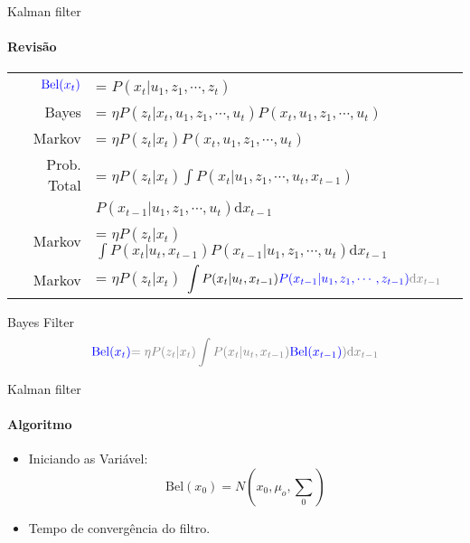 \documentclass{beamer}
\begin{document}
\begin{frame}{Kalman filter}
    \framesubtitle{Revisão}

    \setlength\extrarowheight{5pt}
        \begin{tabular}{r l}
            $\color{blue}{\text{Bel}}(x_t)$ & = $P(x_t| u_1, z_1,  \cdots, z_t)$ \\
            Bayes & = $\eta P(z_t|x_t,  u_1, z_1,  \cdots,  u_t)P(x_t, u_1, z_1, \cdots, u_t)$ \\
            Markov & = $\eta P(z_t|x_t)P(x_t, u_1, z_1, \cdots, u_t)$ \\
            Prob. Total & = $\eta P(z_t|x_t)\displaystyle\int P(x_t| u_1, z_1, \cdots, u_t,x_{t-1})$ \\
                        &  \quad \quad \quad $P(x_{t-1}| u_1, z_1, \cdots, u_t)\text{d}x_{t-1}$\\
            Markov & = $\eta P(z_t|x_t)$ $\displaystyle\int P(x_t| u_t,x_{t-1})P(x_{t-1}| u_1, z_1, \cdots, u_t)\text{d}x_{t-1}$ \\
            Markov & = $\eta P(z_t|x_t)$ $\displaystyle\int P(x_t| u_t,x_{t-1})\color{blue}{P(x_{t-1}| u_1, z_1, \cdots, z_{t-1}})\color{gray}{\text{d}x_{t-1}}$ \\
        \end{tabular}   
    \begin{block}{Bayes Filter}
        \begin{equation*}
            \color{blue}{\text{Bel}}(x_t)  \color{gray}{=\eta P(z_t|x_t)\displaystyle\int P(x_t| u_t,x_{t-1})}\color{blue}{\color{blue}{\text{Bel}}(x_{t-1})}\color{gray}{)\text{d}x_{t-1}}
        \end{equation*}
    \end{block}
\end{frame}


\begin{frame}[c]{Kalman filter}
    \framesubtitle{Algoritmo}

    \begin{itemize}
        \item Iniciando as Variável:
        \begin{equation}
            \text{Bel}(x_0) = N\left(x_0, \mu_o, {\textstyle\sum} _0\right)
        \end{equation}
        \item Tempo de convergência do filtro.
    \end{itemize}
\end{frame}
\end{document}
